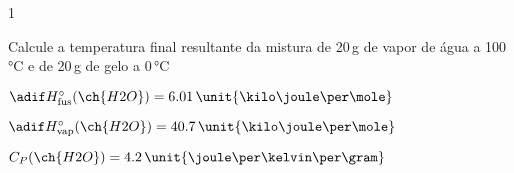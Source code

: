 \begin{questionBox}1{}
    
    Calcule a temperatura final resultante da mistura de 20\,\unit{\gram} de vapor de água a 100\,\unit{\celsius} e de 20\,\unit{\gram} de gelo a 0\,\unit{\celsius}
    
    \begin{itemize}
        \begin{multicols}{2}
            \item \(\adif H^{\circ}_{\text{fus}} (\ch{H2O}) =  6.01\,\unit{\kilo\joule\per\mole}\)
            \item \(\adif H^{\circ}_{\text{vap}} (\ch{H2O}) = 40.7 \,\unit{\kilo\joule\per\mole}\)
            \item \(C_P (\ch{H2O}) = 4.2\,\unit{\joule\per\kelvin\per\gram}\)
        \end{multicols}
    \end{itemize}




\end{questionBox}
